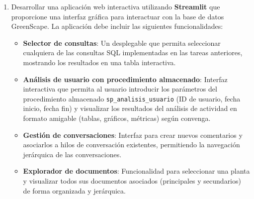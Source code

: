\documentclass[10pt]{article}
\begin{document}
\begin{enumerate}
		Para esta tarea:

		\begin{itemize}
			\item Diseñar una solución de almacenamiento apropiada considerando que los documentos tienen estructuras variables y se organizan de forma jerárquica. Los identificadores de las plantas deben coincidir con los de la base de datos provista. Justificar la elección del modelo de datos.

			\item Implementar la solución diseñada para almacenar documentos principales y secundarios asociados a plantas.

			\item Insertar datos de prueba: al menos $5$ fichas técnicas, cada una con un mínimo de $3$ documentos secundarios de tipos diferentes.

			\item Implementar una operación de consulta que, dado el identificador de una planta, retorne todos sus documentos (principal y secundarios) organizados jerárquicamente.
		\end{itemize}

		\item Desarrollar una aplicación web interactiva utilizando \textbf{Streamlit} que proporcione una interfaz gráfica para interactuar con la base de datos GreenScape. La aplicación debe incluir las siguientes funcionalidades:

		\begin{itemize}
			\item \textbf{Selector de consultas}: Un desplegable que permita seleccionar cualquiera de las consultas SQL implementadas en las tareas anteriores, mostrando los resultados en una tabla interactiva.

			\item \textbf{Análisis de usuario con procedimiento almacenado}: Interfaz interactiva que permita al usuario introducir los parámetros del procedimiento almacenado \texttt{sp\_analisis\_usuario} (ID de usuario, fecha inicio, fecha fin) y visualizar los resultados del análisis de actividad en formato amigable (tablas, gráficos, métricas) según convenga.

			\item \textbf{Gestión de conversaciones}: Interfaz para crear nuevos comentarios y asociarlos a hilos de conversación existentes, permitiendo la navegación jerárquica de las conversaciones.

			\item \textbf{Explorador de documentos}: Funcionalidad para seleccionar una planta y visualizar todos sus documentos asociados (principales y secundarios) de forma organizada y jerárquica.


\end{itemize}
\end{enumerate}
\end{document}
